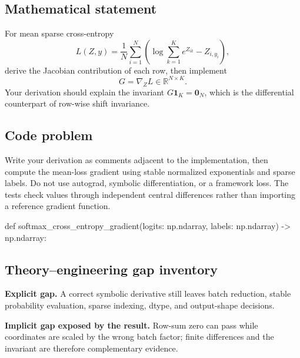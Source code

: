 
        \subsection{Mathematical statement}


For mean sparse cross-entropy
\[
  L(Z,y)=\frac1N\sum_{i=1}^{N}
  \left(\log\sum_{k=1}^{K}e^{Z_{ik}}-Z_{i,y_i}\right),
\]
derive the Jacobian contribution of each row, then implement
\[
  G=\nabla_ZL\in\mathbb R^{N\times K}.
\]
Your derivation should explain the invariant
$G\bm 1_K=\bm 0_N$, which is the differential counterpart of row-wise shift
invariance.


        \subsection{Code problem}


Write your derivation as comments adjacent to the implementation, then compute
the mean-loss gradient using stable normalized exponentials and sparse labels.
Do not use autograd, symbolic differentiation, or a framework loss.  The tests
check values through independent central differences rather than importing a
reference gradient function.


        \begin{contractbox}
        \begin{Code}
        def softmax_cross_entropy_gradient(logits: np.ndarray, labels: np.ndarray) -> np.ndarray:
        \end{Code}
        \end{contractbox}

        \subsection{Theory--engineering gap inventory}

        \begin{gapbox}
        \textbf{Explicit gap.} A correct symbolic derivative still leaves batch reduction, stable probability evaluation, sparse indexing, dtype, and output-shape decisions.

        \textbf{Implicit gap exposed by the result.} Row-sum zero can pass while coordinates are scaled by the wrong batch factor; finite differences and the invariant are therefore complementary evidence.
        \end{gapbox}

